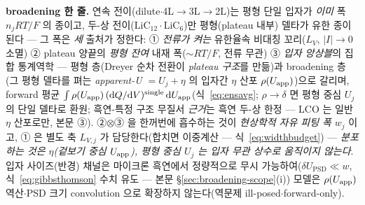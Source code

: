 \begin{keybox}
\textbf{broadening 한 줄.} 연속 전이(dilute$\cdot$4L$\to$3L$\to$2L)는 평형 단일 입자가 \emph{이미} 폭 $n_jRT/F$ 의 종이고,
두-상 전이($\mathrm{LiC_{12}}\cdot\mathrm{LiC_6}$)만 평형(plateau 내부) 델타가 유한 종이 된다 --- 그 폭은 \emph{세}
출처가 정한다: ① \emph{전류가 켜는} 유한율속 비대칭 꼬리($L_V$, $|I|\!\to\!0$ 소멸) ② plateau 양끝의 \emph{평형 잔여}
내재 폭($\sim RT/F$, 전류 무관) ③ \emph{입자 앙상블}의 집합 통계역학 --- 평형 층(Dreyer 순차 전환이 \emph{plateau 구조}를
만듦)과 broadening 층(그 평형 델타를 펴는 \emph{apparent-U $=U_j+\eta$} 의 입자간 $\eta$ 산포 $\rho(U_{\mathrm{app}})$)으로 갈리며,
forward 평균 $\int\rho(U_{\mathrm{app}})\,(\mathrm{d} Q/\mathrm{d} V)^\mathrm{single}\,\mathrm{d} U_{\mathrm{app}}$(식~\eqref{eq:ensavg}; $\rho\!\to\!\delta$ 면
평형 중심 $U_j$ 의 단일 델타로 환원; 흑연-특정 구조 무질서 \emph{근거}는 흑연 두-상 한정 --- LCO 는 일반
$\eta$ 산포로만, 본문 ③). ②$\otimes$③ 을 한꺼번에 흡수하는 것이 \emph{현상학적 자유 피팅 폭} $w_j$ 이고, ① 은 별도 축 $L_{V,j}$ 가 담당한다(합치면 이중계산 --- 식~\eqref{eq:widthbudget}) ---
\emph{분포하는 것은 $\eta$(겉보기 중심 $U_{\mathrm{app}}$), 평형 중심 $U_j$ 는 입자 무관 상수로 움직이지 않는다}. 입자
사이즈(반경) 채널은 마이크론 흑연에서 정량적으로 무시 가능하여($\delta U_\mathrm{PSD}\ll w$,
식~\eqref{eq:gibbsthomson} 수치 유도 --- 본문 \S\ref{sec:broadening-scope}(i)) 모델은 $\rho(U_{\mathrm{app}})$ 역산$\cdot$PSD 크기 convolution
으로 확장하지 않는다(역문제 ill-posed$\cdot$forward-only).
\end{keybox}

